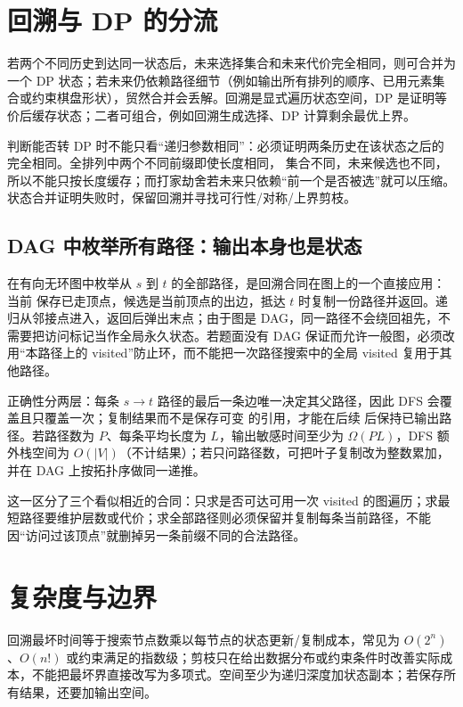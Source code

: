 \documentclass[UTF8,fontset=none,11pt,a4paper]{ctexart}
\begin{document}
\section{回溯与 DP 的分流}

若两个不同历史到达同一状态后，未来选择集合和未来代价完全相同，则可合并为一个 DP 状态；若未来仍依赖路径细节（例如输出所有排列的顺序、已用元素集合或约束棋盘形状），贸然合并会丢解。回溯是显式遍历状态空间，DP 是证明等价后缓存状态；二者可组合，例如回溯生成选择、DP 计算剩余最优上界。

判断能否转 DP 时不能只看“递归参数相同”：必须证明两条历史在该状态之后的完全相同。全排列中两个不同前缀即使长度相同， 集合不同，未来候选也不同，所以不能只按长度缓存；而打家劫舍若未来只依赖“前一个是否被选”就可以压缩。状态合并证明失败时，保留回溯并寻找可行性/对称/上界剪枝。

\subsection{DAG 中枚举所有路径：输出本身也是状态}
在有向无环图中枚举从 $s$ 到 $t$ 的全部路径，是回溯合同在图上的一个直接应用：当前  保存已走顶点，候选是当前顶点的出边，抵达 $t$ 时复制一份路径并返回。递归从邻接点进入，返回后弹出末点；由于图是 DAG，同一路径不会绕回祖先，不需要把访问标记当作全局永久状态。若题面没有 DAG 保证而允许一般图，必须改用“本路径上的 visited”防止环，而不能把一次路径搜索中的全局 visited 复用于其他路径。

正确性分两层：每条 $s\to t$ 路径的最后一条边唯一决定其父路径，因此 DFS 会覆盖且只覆盖一次；复制结果而不是保存可变  的引用，才能在后续  后保持已输出路径。若路径数为 $P$、每条平均长度为 $L$，输出敏感时间至少为 $\Omega(P L)$，DFS 额外栈空间为 $O(|V|)$（不计结果）；若只问路径数，可把叶子复制改为整数累加，并在 DAG 上按拓扑序做同一递推。

这一区分了三个看似相近的合同：只求是否可达可用一次 visited 的图遍历；求最短路径要维护层数或代价；求全部路径则必须保留并复制每条当前路径，不能因“访问过该顶点”就删掉另一条前缀不同的合法路径。

\section{复杂度与边界}

回溯最坏时间等于搜索节点数乘以每节点的状态更新/复制成本，常见为 $O(2^n)$、$O(n!)$ 或约束满足的指数级；剪枝只在给出数据分布或约束条件时改善实际成本，不能把最坏界直接改写为多项式。空间至少为递归深度加状态副本；若保存所有结果，还要加输出空间。
\end{document}
